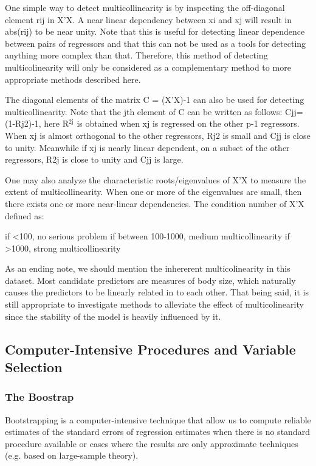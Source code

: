 \documentclass[11pt]{article}
\begin{document}
One simple way to detect multicollinearity is by inspecting the off-diagonal element rij in X’X. A near
linear dependency between xi and xj will result in abs(rij) to be near unity. Note that this is useful for
detecting linear dependence between pairs of regressors and that this can not be used as a tools for
detecting anything more complex than that. Therefore, this method of detecting multicolinearity will
only be considered as a complementary method to more appropriate methods described here.

The diagonal elements of the matrix C = (X’X)-1 can also be used for detecting multicollinearity. Note that 
the jth element of C can be written as follows: Cjj=(1-Rj2)-1, 
here R\(^{\text{2j}}\) is obtained when xj is regressed on the other p-1 regressors.
When xj is almost orthogonal to the other regressors, Rj2 is small and Cjj is close to unity. Meanwhile 
if xj is nearly linear dependent, on a subset of the other regressors, R2j is close to unity and Cjj is large.

One may also analyze the characteristic roots/eigenvalues of X’X to measure the extent of multicollinearity. 
When one or more of the eigenvalues are small, then there exists one or more near-linear dependencies. 
The condition number of X’X defined as:

if <100, no serious problem
if between 100-1000, medium multicollinearity
if >1000, strong multicollinearity

As an ending note, we should mention the inhererent multicolinearity in this dataset. Most candidate predictors 
are measures of body size, which naturally causes the predictors to be linearly related in to each other. That 
being said, it is still appropriate to investigate methods to alleviate the effect of multicolinearity since 
the stability of the model is heavily influenced by it. 

\subsection{Computer-Intensive Procedures and Variable Selection}
\label{sec:orgb254a1f}
\subsubsection{The Boostrap}
\label{sec:org4845e4f}
Bootstrapping is a computer-intensive technique that allow us to compute reliable estimates of the standard
errors of regression estimates when there is no standard procedure available or cases where the results are
only approximate techniques (e.g. based on large-sample theory). 
\end{document}
